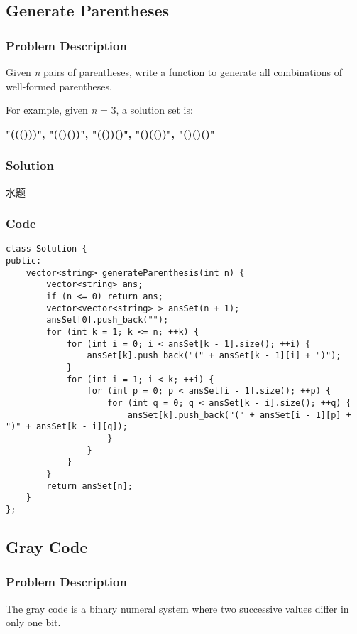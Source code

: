 \documentclass[courier]{article}
\begin{document}
\begin{CJK*}{UTF8}{gkai}
\subsection{ Generate Parentheses }

\subsubsection*{Problem Description}
Given \emph{n} pairs of parentheses, write a function to generate all combinations of well-formed parentheses.

For example, given \emph{n} = 3, a solution set is:

\textbf{"((()))", "(()())", "(())()", "()(())", "()()()"}



\subsubsection*{Solution}
水题

\subsubsection*{Code}
\begin{lstlisting}
class Solution {
public:
    vector<string> generateParenthesis(int n) {
        vector<string> ans;
        if (n <= 0) return ans;
        vector<vector<string> > ansSet(n + 1);
        ansSet[0].push_back("");
        for (int k = 1; k <= n; ++k) {
            for (int i = 0; i < ansSet[k - 1].size(); ++i) {
                ansSet[k].push_back("(" + ansSet[k - 1][i] + ")");
            }
            for (int i = 1; i < k; ++i) {
                for (int p = 0; p < ansSet[i - 1].size(); ++p) {
                    for (int q = 0; q < ansSet[k - i].size(); ++q) {
                        ansSet[k].push_back("(" + ansSet[i - 1][p] + ")" + ansSet[k - i][q]);
                    }
                }
            }
        }
        return ansSet[n];
    }
}; 
\end{lstlisting}


\subsection{ Gray Code }

\subsubsection*{Problem Description}
The gray code is a binary numeral system where two successive values differ in only one bit.


\end{CJK*}
\end{document}
